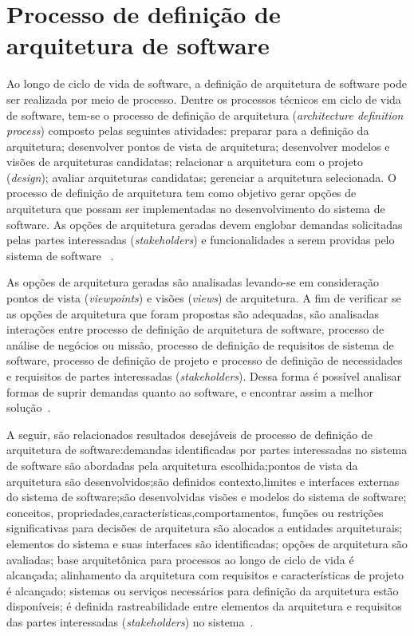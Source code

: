 \section{Processo de definição de arquitetura de software}

Ao longo de ciclo de vida de software, a definição de arquitetura de software pode ser realizada por meio de processo. Dentre os processos técnicos em ciclo de vida de software, tem-se o processo de definição de arquitetura (\emph{architecture definition process}) composto pelas seguintes atividades: preparar para a definição da arquitetura; desenvolver pontos de vista de arquitetura; desenvolver modelos e visões de arquiteturas candidatas; relacionar a arquitetura com o projeto (\emph{design}); avaliar arquiteturas candidatas; gerenciar a arquitetura selecionada. O processo de definição de arquitetura tem como objetivo gerar opções de arquitetura que possam ser implementadas no desenvolvimento do sistema de software. As opções de arquitetura geradas devem englobar demandas solicitadas pelas partes interessadas (\emph{stakeholders}) e funcionalidades a serem providas pelo sistema de software ~\cite{ISO_12207}.

As opções de arquitetura geradas são analisadas levando-se em consideração pontos de vista (\emph{viewpoints}) e visões (\emph{views}) de arquitetura. A fim de verificar se as opções de arquitetura que foram propostas são adequadas, são analisadas interações entre processo de definição de arquitetura de software, processo de análise de negócios ou missão, processo de definição de requisitos de sistema de software, processo de definição de projeto e processo de definição de necessidades e requisitos de partes interessadas (\emph{stakeholders}). Dessa forma é possível analisar formas de suprir demandas quanto ao software, e encontrar assim a melhor solução~\cite{ISO_12207}. 

A seguir, são relacionados resultados desejáveis de processo de definição de arquitetura de software:demandas identificadas por partes interessadas no sistema de software são abordadas pela arquitetura escolhida;pontos de vista da arquitetura são desenvolvidos;são definidos contexto,limites e interfaces externas do sistema de software;são desenvolvidas visões e modelos do sistema de software; 
conceitos, propriedades,características,comportamentos, 
funções ou restrições significativas para decisões de arquitetura são alocados a entidades arquiteturais; elementos do sistema e suas interfaces são identificadas; opções de arquitetura são avaliadas; base arquitetônica para processos ao longo de ciclo de vida é alcançada; 
alinhamento da arquitetura com requisitos e características de projeto é alcançado; sistemas ou serviços necessários para definição da arquitetura estão disponíveis; 
é definida rastreabilidade entre elementos da arquitetura e requisitos das partes interessadas (\emph{stakeholders}) no sistema~\cite{ISO_12207}.  

